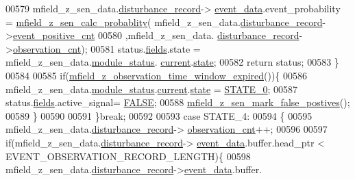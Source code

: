 \begin{DoxyCode}
00579                mfield\_z\_sen\_data.\hyperlink{a00027_ac9b38e2c1d3f1013a88d33506c754152}{disturbance\_record}->
      \hyperlink{a00028_a8c0bda69e71ef674e60da47ad0be9ab0}{event\_data}.event\_probability = \hyperlink{a00053_a8a5c3986dbe778d199b6e3b485f7a34b}{mfield\_z\_sen\_calc\_probablity}(
      mfield\_z\_sen\_data.\hyperlink{a00027_ac9b38e2c1d3f1013a88d33506c754152}{disturbance\_record}->\hyperlink{a00028_a7397b9d76d4b57500f27bb23d258a18a}{event\_positive\_cnt}
00580                                                                                     ,mfield\_z\_sen\_data.
      \hyperlink{a00027_ac9b38e2c1d3f1013a88d33506c754152}{disturbance\_record}->\hyperlink{a00028_ad5b0bac02ce266b91b2b52a1c3ea1d78}{observation\_cnt});
00581               status.\hyperlink{a00021_a5296d090c085b0421fdf5a86e382abea}{fields}.state = mfield\_z\_sen\_data.\hyperlink{a00027_adfab5a5d8b45a93dfb13edb24e2b80e3}{module\_status}.
      \hyperlink{a00019_acf41ffc11da291c2f9f0fcb02ee72b98}{current}.\hyperlink{a00019_a6b8d8e916bc56265a3fd279bd26b6d1b}{state};
00582                \textcolor{keywordflow}{return} status;
00583              \}
00584 
00585              \textcolor{keywordflow}{if}(\hyperlink{a00053_a8d1f1b622ef0081218e8f64cd9a44e59}{mfield\_z\_observation\_time\_window\_expired}())\{
00586                mfield\_z\_sen\_data.\hyperlink{a00027_adfab5a5d8b45a93dfb13edb24e2b80e3}{module\_status}.\hyperlink{a00019_acf41ffc11da291c2f9f0fcb02ee72b98}{current}.\hyperlink{a00019_a6b8d8e916bc56265a3fd279bd26b6d1b}{state} = 
      \hyperlink{a00021_ad6739dbbe5581cac99b7dc8a5e09949c}{STATE\_0};
00587                status.\hyperlink{a00021_a5296d090c085b0421fdf5a86e382abea}{fields}.active\_signal= \hyperlink{a00040_aa93f0eb578d23995850d61f7d61c55c1}{FALSE};
00588                \hyperlink{a00053_acd2adf617d062b1d3dfc9df79aa2ad32}{mfield\_z\_sen\_mark\_false\_postives}();
00589              \}
00590 
00591         \}\textcolor{keywordflow}{break};
00592 
00593          \textcolor{keywordflow}{case} STATE\_4: 
00594         \{
00595             mfield\_z\_sen\_data.\hyperlink{a00027_ac9b38e2c1d3f1013a88d33506c754152}{disturbance\_record}->
      \hyperlink{a00028_ad5b0bac02ce266b91b2b52a1c3ea1d78}{observation\_cnt}++;
00596 
00597             \textcolor{keywordflow}{if}(mfield\_z\_sen\_data.\hyperlink{a00027_ac9b38e2c1d3f1013a88d33506c754152}{disturbance\_record}->
      \hyperlink{a00028_a8c0bda69e71ef674e60da47ad0be9ab0}{event\_data}.buffer.head\_ptr < EVENT\_OBSERVATION\_RECORD\_LENGTH)\{
00598             mfield\_z\_sen\_data.\hyperlink{a00027_ac9b38e2c1d3f1013a88d33506c754152}{disturbance\_record}->\hyperlink{a00028_a8c0bda69e71ef674e60da47ad0be9ab0}{event\_data}.buffer.

\end{DoxyCode}
